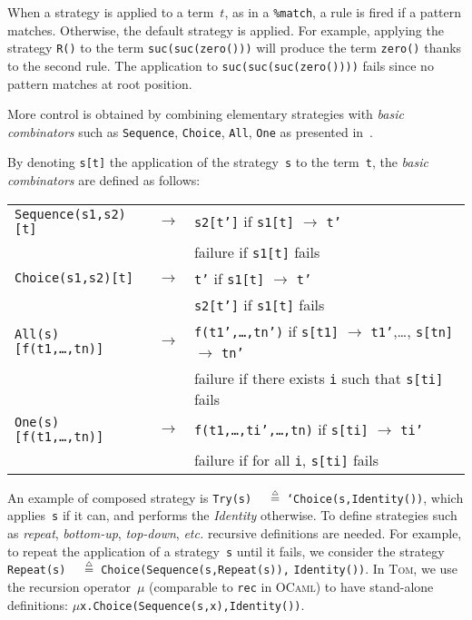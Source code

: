 \documentclass[runningheads]{llncs}
\newcommand{\tom}{\textsc{Tom}}
\newcommand{\ocaml}{\textsc{OCaml}}
\newcommand{\isdef}{\mathrel{\mbox{\small$\stackrel{\mbox{\tiny$\triangle$}}{=}$}}}
\newcommand{\Mu}{{\ensuremath{\mu}}}
\newcommand{\etc}{\textit{etc.}}
\begin{document}
When a strategy is applied to a term~$t$, as in a \texttt{\%match}, a rule is
fired if a pattern matches. Otherwise, the default strategy is applied.
For example, applying the strategy \texttt{R()} to the term
\texttt{suc(suc(zero()))} will produce the term \texttt{zero()} thanks to the
second rule. The application to \texttt{suc(suc(suc(zero())))} fails since no
pattern matches at root position.

More control is obtained by combining elementary strategies with \emph{basic
combinators} such as \texttt{Sequence}, \texttt{Choice},
\texttt{All}, \texttt{One} as presented
in~\cite{BKK98,visser-icfp98}.

By denoting \texttt{s[t]} the application of the strategy~\texttt{s} to the
term~\texttt{t}, the \emph{basic combinators} are defined as follows:

\begin{small}
\begin{tabular}{lll}

\texttt{Sequence(s1,s2)[t]} & $\rightarrow$ & \texttt{s2[t']} if \texttt{s1[t]}
$\rightarrow$ \texttt{t'}\\
&& failure if \texttt{s1[t]} fails\\

\texttt{Choice(s1,s2)[t]} & $\rightarrow$ & \texttt{t'} if \texttt{s1[t]}
$\rightarrow$ \texttt{t'}\\
&& \texttt{s2[t']} if \texttt{s1[t]} fails\\

\texttt{All(s)[f(t1,\ldots,tn)]} & $\rightarrow$ & \texttt{f(t1',\ldots,tn')}
if \texttt{s[t1]} $\rightarrow$ \texttt{t1'},\ldots, \texttt{s[tn]}
$\rightarrow$ \texttt{tn'}\\
&& failure if there exists \texttt{i} such that \texttt{s[ti]} fails\\

\texttt{One(s)[f(t1,\ldots,tn)]} & $\rightarrow$ &
\texttt{f(t1,\ldots,ti',\ldots,tn)} if \texttt{s[ti]}  $\rightarrow$
\texttt{ti'}\\
&& failure if for all \texttt{i}, \texttt{s[ti]} fails\\
\end{tabular}
\end{small}

An example of composed strategy is
\texttt{Try(s)}~${\isdef}$~\texttt{`Choice(s,Identity())},
which applies~\texttt{s} if it can, and performs the \textit{Identity} otherwise.
To define strategies such as \emph{repeat}, \emph{bottom-up}, \emph{top-down},
{\etc} recursive definitions are needed. For example, to repeat the application
of a strategy~\texttt{s} until it fails, we consider the strategy
\texttt{Repeat(s)}~${\isdef}$~\texttt{Choice(Sequence(s,Repeat(s)),}
\texttt{Identity())}.  In {\tom}, we use the recursion operator~$\Mu$
(comparable to \texttt{rec} in {\ocaml}) to have stand-alone definitions:
$\Mu$\texttt{x.Choice(Sequence(s,x),Identity())}.
\end{document}
